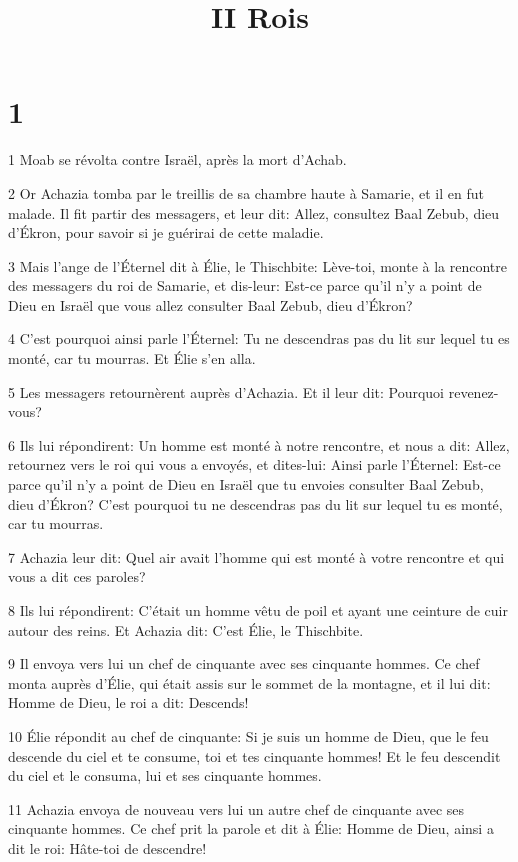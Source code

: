 

\title{II Rois}


\chapter{1}

\par 1 Moab se révolta contre Israël, après la mort d'Achab.
\par 2 Or Achazia tomba par le treillis de sa chambre haute à Samarie, et il en fut malade. Il fit partir des messagers, et leur dit: Allez, consultez Baal Zebub, dieu d'Ékron, pour savoir si je guérirai de cette maladie.
\par 3 Mais l'ange de l'Éternel dit à Élie, le Thischbite: Lève-toi, monte à la rencontre des messagers du roi de Samarie, et dis-leur: Est-ce parce qu'il n'y a point de Dieu en Israël que vous allez consulter Baal Zebub, dieu d'Ékron?
\par 4 C'est pourquoi ainsi parle l'Éternel: Tu ne descendras pas du lit sur lequel tu es monté, car tu mourras. Et Élie s'en alla.
\par 5 Les messagers retournèrent auprès d'Achazia. Et il leur dit: Pourquoi revenez-vous?
\par 6 Ils lui répondirent: Un homme est monté à notre rencontre, et nous a dit: Allez, retournez vers le roi qui vous a envoyés, et dites-lui: Ainsi parle l'Éternel: Est-ce parce qu'il n'y a point de Dieu en Israël que tu envoies consulter Baal Zebub, dieu d'Ékron? C'est pourquoi tu ne descendras pas du lit sur lequel tu es monté, car tu mourras.
\par 7 Achazia leur dit: Quel air avait l'homme qui est monté à votre rencontre et qui vous a dit ces paroles?
\par 8 Ils lui répondirent: C'était un homme vêtu de poil et ayant une ceinture de cuir autour des reins. Et Achazia dit: C'est Élie, le Thischbite.
\par 9 Il envoya vers lui un chef de cinquante avec ses cinquante hommes. Ce chef monta auprès d'Élie, qui était assis sur le sommet de la montagne, et il lui dit: Homme de Dieu, le roi a dit: Descends!
\par 10 Élie répondit au chef de cinquante: Si je suis un homme de Dieu, que le feu descende du ciel et te consume, toi et tes cinquante hommes! Et le feu descendit du ciel et le consuma, lui et ses cinquante hommes.
\par 11 Achazia envoya de nouveau vers lui un autre chef de cinquante avec ses cinquante hommes. Ce chef prit la parole et dit à Élie: Homme de Dieu, ainsi a dit le roi: Hâte-toi de descendre!
